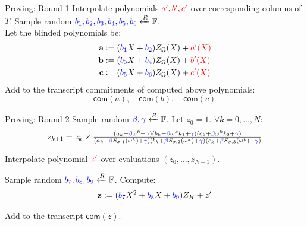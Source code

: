 \documentclass{zkdl-presentation-template}
\begin{document}
    \begin{frame} {Proving: Round 1}
        Interpolate polynomials $\textcolor{red}{a', b', c'}$ over corresponding columns of $T$.
        Sample random $\textcolor{blue}{b_1, b_2, b_3, b_4, b_5, b_6} \xleftarrow{R} \mathbb{F}$. \\
        \vspace{1em}
        Let the blinded polynomials be:
        \begin{align*}
        \centering
            \textbf{a} &:= (\textcolor{blue}{b_1} X + \textcolor{blue}{b_2})Z_{\Omega}(X) + \textcolor{red}{a'(X)} \\
            \textbf{b} &:= (\textcolor{blue}{b_3} X + \textcolor{blue}{b_4})Z_{\Omega}(X) + \textcolor{red}{b'(X)} \\
            \textbf{c} &:= (\textcolor{blue}{b_5} X + \textcolor{blue}{b_6})Z_{\Omega}(X) + \textcolor{red}{c'(X)}
        \end{align*}
        Add to the transcript commitments of computed above polynomials:
        \begin{equation*}
            \mathsf{com}(a), \quad \mathsf{com}(b), \quad \mathsf{com}(c)
        \end{equation*}
    \end{frame}

    \begin{frame} {Proving: Round 2}
        Sample random $\textcolor{blue}{\beta, \gamma} \xleftarrow{R} \mathbb{F}$. Let $z_0 = 1$. 
        $\forall k = 0, \dots, N:$\\
        \begin{equation*}
            z_{k+1} = z_{k} \times \textstyle\frac{(a_k + \textcolor{blue}{\beta} \omega^{k} + \textcolor{blue}{\gamma}) (b_k + \textcolor{blue}{\beta} \omega^{k}k_1 + \textcolor{blue}{\gamma}) (c_k + \textcolor{blue}{\beta} \omega^{k}k_2 + \textcolor{blue}{\gamma})}{(a_k + \textcolor{blue}{\beta} S_{\sigma,1}(\omega^{k}) + \textcolor{blue}{\gamma}) (b_k + \textcolor{blue}{\beta} S_{\sigma,2}(\omega^{k}) + \textcolor{blue}{\gamma}) (c_k + \textcolor{blue}{\beta} S_{\sigma,3}(\omega^{k}) + \textcolor{blue}{\gamma})}
        \end{equation*}

        Interpolate polynomial $\textcolor{red}{z'}$ over evaluations $(z_0, \dots, z_{N-1})$.

        Sample random $\textcolor{blue}{b_7, b_8, b_9} \xleftarrow{R} \mathbb{F}$. Compute:
        \begin{equation*}
            \textbf{z} := (\textcolor{blue}{b_7} X^2 + \textcolor{blue}{b_8} X + \textcolor{blue}{b_9})Z_H + z'
        \end{equation*}
        
        Add to the transcript $\mathsf{com}(z)$.
    \end{frame}
\end{document}
